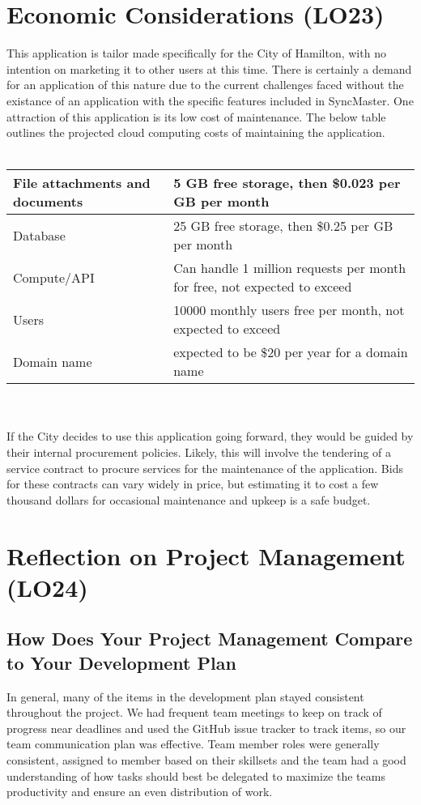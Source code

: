 \documentclass{article}
\begin{document}
\section{Economic Considerations (LO23)}
This application is tailor made specifically for the City of Hamilton, with no intention on marketing it to
other users at this time. There is certainly a demand for an application of this nature due to 
the current challenges faced without the existance of an application with the specific features
included in SyncMaster. One attraction of this application is its low cost of maintenance. The below table outlines the projected
cloud computing costs of maintaining the application.\\
\\
\begin{tabular}{|m{5cm}|m{5cm}|}
  \hline
  File attachments and documents & 5 GB free storage, then \$0.023 per GB per month\\
  \hline
  Database & 25 GB free storage, then \$0.25 per GB per month\\
  \hline
  Compute/API & Can handle 1 million requests per month for free, not expected to exceed\\
  \hline
  Users & 10000 monthly users free per month, not expected to exceed\\
  \hline
  Domain name & expected to be \$20 per year for a domain name\\
  \hline
\end{tabular}
\\
\\
If the City decides to use this application going forward, they would be guided by their internal procurement policies. Likely, this will involve the
tendering of a service contract to procure services for the maintenance of the application. Bids for these contracts can vary 
widely in price, but estimating it to cost a few thousand dollars for occasional maintenance and upkeep is a safe budget.

\section{Reflection on Project Management (LO24)}

\subsection{How Does Your Project Management Compare to Your Development Plan}

In general, many of the items in the development plan stayed consistent throughout the project. We had frequent team meetings
to keep on track of progress near deadlines and used the GitHub issue tracker to track items, so our team communication plan
was effective. Team member roles were generally consistent, assigned to member based on their skillsets and the team had a good
understanding of how tasks should best be delegated to maximize the teams productivity and ensure an even distribution of work.
\end{document}
